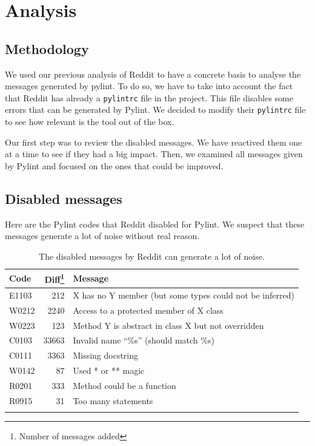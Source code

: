 \documentclass[11pt, a4paper]{article}
\newcommand{\pyl}{\textsf{Pylint}}
\begin{document}
\section*{Analysis}
\subsection*{Methodology}

We used our previous analysis of Reddit to have a concrete basis to analyse the messages generated by pylint.
To do so, we have to take into account the fact that Reddit has already a \texttt{pylintrc} file in the project.
This file disables some errors that can be generated by \pyl{}.
We decided to modify their \texttt{pylintrc} file to see how relevant is the tool out of the box.
\medskip


Our first step was to review the disabled messages.
We have reactived them one at a time to see if they had a big impact.
Then, we examined all messages given by \pyl{} and focused on the ones that could be improved.

\subsection*{Disabled messages}
Here are the \pyl{} codes that Reddit disabled for \pyl{}. 
We suspect that these messages generate a lot of noise without real reason.
\\

\begin{longtable}{|l|r|m{9cm}|}
\hline
\textbf{\small{Code}} & \textbf{\small{Diff\footnote{Number of messages added}}} & \textbf{\small{Message}} \\
\hline
\hline
E1103 & 212 & X has no Y member (but some types could not be inferred) \\
\hline
W0212 & 2240  & Access to a protected member of X class \\
\hline
W0223 & 123 & Method Y is abstract in class X but not overridden \\
\hline
C0103 & 33663 & Invalid name ``\%s'' (should match \%s) \\
\hline
C0111 & 3363 & Missing docstring \\
\hline
W0142 & 87 & Used * or ** magic \\
\hline
R0201 & 333 & Method could be a function \\
\hline
R0915 & 31 & Too many statements \\
\hline
\caption{\label{messages} The disabled messages by Reddit can generate a lot of noise. }
\end{longtable}
\end{document}
